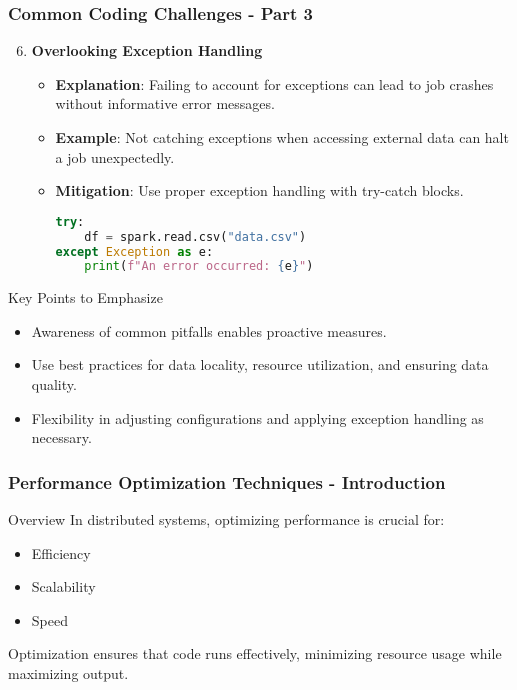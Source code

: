 \documentclass[aspectratio=169]{beamer}
\begin{document}
\begin{frame}[fragile]
    \frametitle{Common Coding Challenges - Part 3}
    \begin{enumerate}
        \setcounter{enumi}{5}
        
        \item \textbf{Overlooking Exception Handling}
            \begin{itemize}
                \item \textbf{Explanation}: Failing to account for exceptions can lead to job crashes without informative error messages.
                \item \textbf{Example}: Not catching exceptions when accessing external data can halt a job unexpectedly.
                \item \textbf{Mitigation}: Use proper exception handling with try-catch blocks.
                \begin{lstlisting}[language=python]
try:
    df = spark.read.csv("data.csv")
except Exception as e:
    print(f"An error occurred: {e}")
                \end{lstlisting}
            \end{itemize}
    \end{enumerate}
        
    \begin{block}{Key Points to Emphasize}
        \begin{itemize}
            \item Awareness of common pitfalls enables proactive measures.
            \item Use best practices for data locality, resource utilization, and ensuring data quality.
            \item Flexibility in adjusting configurations and applying exception handling as necessary.
        \end{itemize}
    \end{block}
\end{frame}

\begin{frame}[fragile]
    \frametitle{Performance Optimization Techniques - Introduction}
    \begin{block}{Overview}
        In distributed systems, optimizing performance is crucial for:
        \begin{itemize}
            \item Efficiency
            \item Scalability
            \item Speed
        \end{itemize}
        Optimization ensures that code runs effectively, minimizing resource usage while maximizing output.
    \end{block}
\end{frame}
\end{document}
